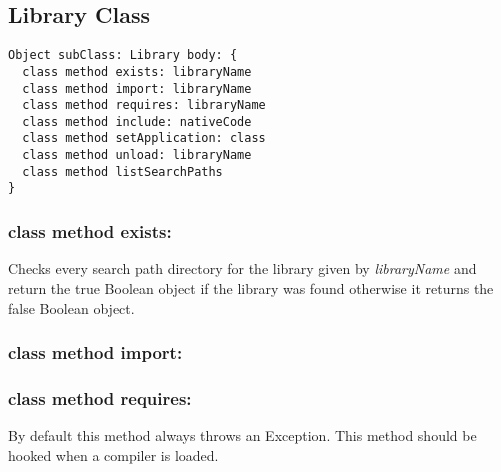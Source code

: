 \subsection{Library Class}

\begin{lstlisting}
Object subClass: Library body: {
  class method exists: libraryName
  class method import: libraryName
  class method requires: libraryName
  class method include: nativeCode
  class method setApplication: class
  class method unload: libraryName
  class method listSearchPaths
}
\end{lstlisting}

\subsubsection{class method exists:}
Checks every search path directory for the library given by \textit{libraryName} and return the true Boolean object if the library was found otherwise it returns the false Boolean object.

\subsubsection{class method import:}

\subsubsection{class method requires:}
By default this method always throws an Exception. This method should be hooked when a compiler is loaded.